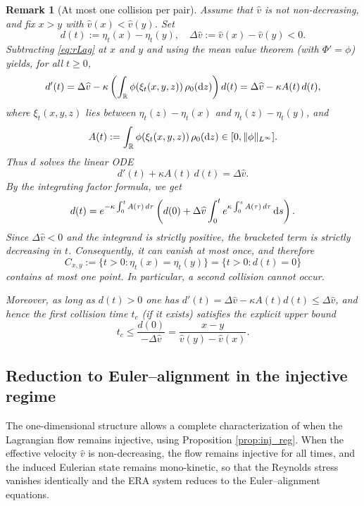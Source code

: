\documentclass[10pt,reqno]{amsart}
\renewcommand{\ge}{\geqslant}
\renewcommand{\le}{\leqslant}
\numberwithin{equation}{section}
\newtheorem{remark}{Remark}[section]
\newcommand{\R}{\mathbb R}
\newcommand{\lt}{\left}
\newcommand{\rt}{\right}
\newcommand{\dz}{\textnormal{d}z}
\newcommand{\ds}{\textnormal{d}s}
\begin{document}
\begin{remark}[At most one collision per pair]\label{rmk:one_c}
Assume that $\widehat v$ is not non-decreasing, and fix $x>y$ with $\widehat v(x)<\widehat v(y)$.  Set
\[
d(t):=\eta_t(x)-\eta_t(y),\quad \Delta\widehat v:=\widehat v(x)-\widehat v(y)<0.
\]
Subtracting \eqref{eq:rLag} at $x$ and $y$ and using the mean value theorem (with $\Phi'=\phi$) yields, for all $t\ge0$,
\[
d'(t)
=\Delta\widehat v -\kappa \lt(\int_\R\phi(\xi_t(x,y,z))\,\rho_0(\dz)\rt) d(t) = \Delta\widehat v-\kappa A(t)\,d(t),
\]
where $\xi_t(x,y,z)$ lies between $\eta_t(z)-\eta_t(x)$ and $\eta_t(z)-\eta_t(y)$, and
\[
A(t):=\int_\R\phi (\xi_t(x,y,z) )\,\rho_0(\dz)\in[0,\|\phi\|_{L^\infty}].
\]
Thus $d$ solves the linear ODE
\[
d'(t)+\kappa A(t)\,d(t)=\Delta\widehat v.
\]
By the integrating factor formula, we get
\[
d(t)=e^{-\kappa\int_0^t A(\tau)\,d\tau}\lt( d(0)+\Delta\widehat v\int_0^t e^{\kappa\int_0^s A(\tau)\,d\tau}\,\ds\rt).
\]
Since $\Delta\widehat v<0$ and the integrand is strictly positive, the bracketed term is strictly decreasing in $t$. Consequently, it can vanish at most once, and therefore
\[
C_{x,y}:=\{t>0:\eta_t(x)=\eta_t(y)\}=\{t>0:d(t)=0\}
\]
contains at most one point. In particular, a second collision cannot occur.

Moreover, as long as $d(t)>0$ one has $d'(t)=\Delta\widehat v-\kappa A(t)d(t)\le \Delta\widehat v$, and hence the first collision time $t_c$ (if it exists) satisfies the explicit upper bound
\[
t_c \le \frac{d(0)}{-\Delta\widehat v}=\frac{x-y}{\widehat v(y)-\widehat v(x)}.
\]
\end{remark}

 
 

 \subsection{Reduction to Euler--alignment in the injective regime}
 
The one-dimensional structure allows a complete characterization of when the Lagrangian flow remains injective, using Proposition \ref{prop:inj_reg}. When the effective velocity $\widehat v$ is non-decreasing, the flow remains injective for all times, and the induced Eulerian state remains mono-kinetic, so that the Reynolds stress vanishes identically and the ERA system reduces to the Euler--alignment equations.
\end{document}
